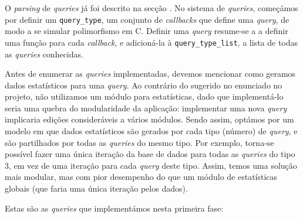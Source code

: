 \documentclass[12pt, a4paper]{article}
\begin{document}
O \emph{parsing} de \emph{queries} já foi descrito na secção . No sistema de
\emph{queries}, começámos por definir um \texttt{query\_type}, um conjunto de \emph{callbacks} que
define uma \emph{query}, de modo a se simular polimorfismo em C. Definir uma \emph{query} resume-se
a a definir uma função para cada \emph{callback}, e adicioná-la à \texttt{query\_type\_list}, a
lista de todas as \emph{queries} conhecidas.

Antes de enumerar as \emph{queries} implementadas, devemos mencionar como geramos dados estatísticos
para uma \emph{query}. Ao contrário do sugerido no enunciado no projeto, não utilizamos um módulo
para estatísticas, dado que implementá-lo seria uma quebra do modularidade da aplicação: implementar
uma nova \emph{query} implicaria edições consideráveis a vários módulos. Sendo assim, optámos por um
modelo em que dados estatísticos são gerados por cada tipo (número) de \emph{query}, e são
partilhados por todas as \emph{queries} do mesmo tipo. Por exemplo, torna-se possível fazer uma
única iteração da base de dados para todas as \emph{queries} do tipo 3, em vez de uma iteração para
cada \emph{query} deste tipo. Assim, temos uma solução mais modular, mas com pior desempenho do que
um módulo de estatísticas globais (que faria uma única iteração pelos dados).

Estas são as \emph{queries} que implementámos nesta primeira fase:
\end{document}
